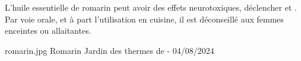 {%
    \begin{Remarque}
        L'huile essentielle de romarin peut avoir des effets neurotoxiques, déclencher  et .\\
        Par voie orale, et à part l'utilisation en cuisine, il est déconseillé aux femmes enceintes ou allaitantes.
    \end{Remarque}
}
{%
    romarin.jpg
}
{%
    Romarin
}
{%
    Jardin des thermes de  - 04/08/2024 
}

